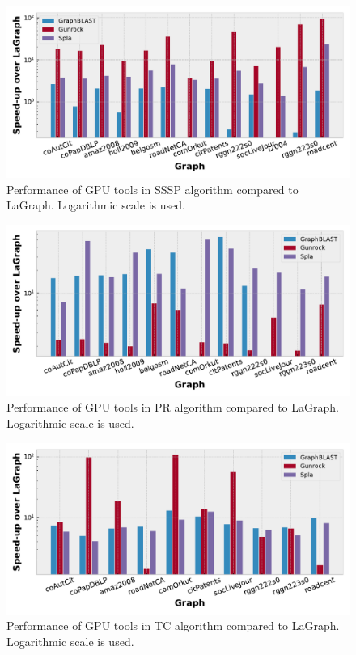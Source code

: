 \begin{figure}[tbp]
\centering
\includegraphics[width=0.9\linewidth]{plots/rq1_rel_sssp.pdf}
\caption{Performance of GPU tools in SSSP algorithm compared to LaGraph. Logarithmic scale is used.}
\label{fig:rq1_sssp}
\end{figure}

\begin{figure}[tbp]
\centering
\includegraphics[width=0.9\linewidth]{plots/rq1_rel_pr.pdf}
\caption{Performance of GPU tools in PR algorithm compared to LaGraph. Logarithmic scale is used.}
\label{fig:rq1_pr}
\end{figure}

\begin{figure}[tbp]
\centering
\includegraphics[width=0.9\linewidth]{plots/rq1_rel_tc.pdf}
\caption{Performance of GPU tools in TC algorithm compared to LaGraph. Logarithmic scale is used.}
\label{fig:rq1_tc}
\end{figure}


